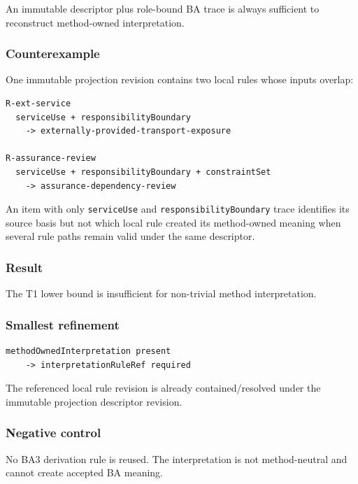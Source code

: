 \documentclass[11pt,a4paper]{article}
\begin{document}
An immutable descriptor plus role-bound BA trace is always sufficient to
reconstruct method-owned interpretation.

\subsubsection{Counterexample}\label{counterexample}

One immutable projection revision contains two local rules whose inputs
overlap:

\begin{verbatim}
R-ext-service
  serviceUse + responsibilityBoundary
    -> externally-provided-transport-exposure

R-assurance-review
  serviceUse + responsibilityBoundary + constraintSet
    -> assurance-dependency-review
\end{verbatim}

An item with only \texttt{serviceUse} and
\texttt{responsibilityBoundary} trace identifies its source basis but
not which local rule created its method-owned meaning when several rule
paths remain valid under the same descriptor.

\subsubsection{Result}\label{result-1}

The T1 lower bound is insufficient for non-trivial method
interpretation.

\subsubsection{Smallest refinement}\label{smallest-refinement}

\begin{verbatim}
methodOwnedInterpretation present
    -> interpretationRuleRef required
\end{verbatim}

The referenced local rule revision is already contained/resolved under
the immutable projection descriptor revision.

\subsubsection{Negative control}\label{negative-control}

No BA3 derivation rule is reused. The interpretation is not
method-neutral and cannot create accepted BA meaning.
\end{document}
